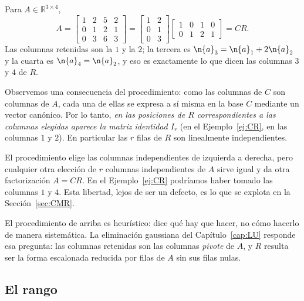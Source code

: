 \begin{example}\label{ej:CR}
Para $A \in \mathbb{R}^{3 \times 4}$,
\[
A = \begin{bmatrix}
    1 & 2 & 5 & 2 \\
    0 & 1 & 2 & 1 \\
    0 & 3 & 6 & 3
\end{bmatrix} =
\begin{bmatrix} 1 & 2 \\ 0 & 1 \\ 0 & 3 \end{bmatrix}
\begin{bmatrix} 1 & 0 & 1 & 0 \\ 0 & 1 & 2 & 1 \end{bmatrix} = CR .
\]
Las columnas retenidas son la $1$ y la $2$; la tercera es
$\n{a}_3 = \n{a}_1 + 2\n{a}_2$ y la cuarta es $\n{a}_4 = \n{a}_2$, y eso es
exactamente lo que dicen las columnas $3$ y $4$ de $R$.
\end{example}

Observemos una consecuencia del procedimiento: como las columnas de $C$ son
columnas de $A$, cada una de ellas se expresa a sí misma en la base $C$
mediante un vector canónico. Por lo tanto, \emph{en las posiciones de $R$
correspondientes a las columnas elegidas aparece la matriz identidad $I_r$} (en
el Ejemplo~\ref{ej:CR}, en las columnas $1$ y $2$). En particular las $r$ filas
de $R$ son linealmente independientes.

\begin{remark}
El procedimiento elige las columnas independientes de izquierda a derecha, pero
cualquier otra elección de $r$ columnas independientes de $A$ sirve igual y da
otra factorización $A=CR$. En el Ejemplo~\ref{ej:CR} podríamos haber tomado las
columnas $1$ y $4$. Esta libertad, lejos de ser un defecto, es lo que se explota
en la Sección~\ref{sec:CMR}.
\end{remark}

\begin{remark}
El procedimiento de arriba es heurístico: dice qué hay que hacer, no cómo
hacerlo de manera sistemática. La eliminación gaussiana del
Capítulo~\ref{cap:LU} responde esa pregunta: las columnas retenidas son las
columnas \emph{pivote} de $A$, y $R$ resulta ser la forma escalonada reducida
por filas de $A$ sin sus filas nulas.
\end{remark}

\subsection{El rango}

